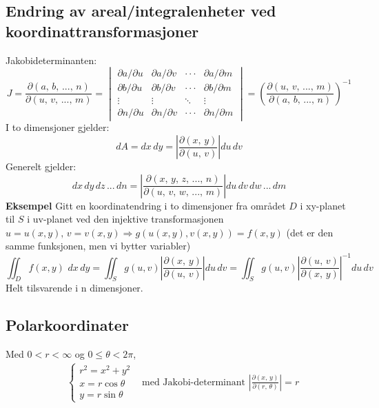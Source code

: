 \documentclass[fleqn,12pt]{wlscirep}
\begin{document}
\subsection{Endring av areal/integralenheter ved koordinattransformasjoner}
\vskip 5pt
Jakobideterminanten:
\begin{equation}
    J = \frac{\partial(a,\,b,\, ... , \, n)}{\partial(u,\, v,\, ...,\, m)} = 
    \begin{vmatrix}
    \partial a/\partial u & \partial a / \partial v & \cdot \cdot\cdot & \partial a / \partial m \\
    \partial b/\partial u & \partial b / \partial v & \cdot\cdot\cdot& \partial b / \partial m\\
    \vdots &\vdots &\ddots &\vdots\\
    \partial n/\partial u & \partial n / \partial v &\cdot\cdot\cdot & \partial n / \partial m
    \end{vmatrix} = \left(\frac{\partial(u,\, v,\, ...,\, m)}{\partial(a,\,b,\, ... , \, n)}\right)^{-1}
\end{equation}\vskip10pt
\noindent
I to dimensjoner gjelder: 
\begin{equation}
    dA = dx\,dy = \left|\frac{\partial(x,\,y)}{\partial(u,\, v)}\right|du\,dv
\end{equation}\vskip10pt
\noindent
Generelt gjelder:
\begin{equation}
    dx\,dy\,dz\, ... \, dn = \left|\frac{\partial(x,\,y,\, z,\, ... , \, n)}{\partial(u,\, v,\, w,\, ...,\, m)}\right| du\,dv\,dw\,...\,dm
\end{equation} \vskip10pt
\noindent \textbf{Eksempel} Gitt en koordinatendring i to dimensjoner fra området $D$ i xy-planet til $S$ i uv-planet ved den injektive transformasjonen $u = u(x,y),\, v = v(x,y) \Longrightarrow g(u(x,y),v(x,y)) = f(x,y)$ (det er den samme funksjonen, men vi bytter variabler)
\begin{equation}
 \iint_D f(x, y)\,\, dx\, dy  = \iint_S g(u,v) \left|\frac{\partial(x,\,y)}{\partial(u,\, v)}\right|du\,dv = \iint_S g(u,v) \left|\frac{\partial(u,\, v)}{\partial(x,\,y)}\right|^{-1}du\,dv
\end{equation}
Helt tilsvarende i n dimensjoner.

\subsection{Polarkoordinater}
Med $ 0<r<\infty$ og $ 0\leq \theta < 2\pi$,
\begin{align}
    &\begin{cases}
    r^2 = x^2 + y^2\\
    x = r \cos{\theta}\\
    y = r \sin{\theta}
    \end{cases}
    &\text{med Jakobi-determinant } \left|\frac{\partial(x,\,y)}{\partial(r,\, \theta)}\right| = r
\end{align}
\end{document}

